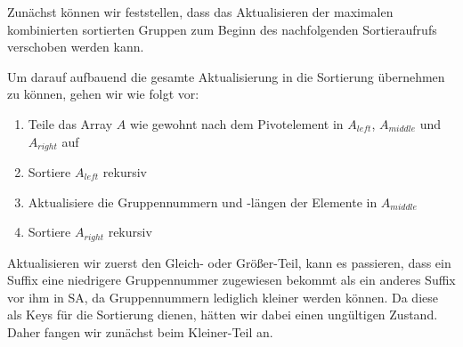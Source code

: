 Zunächst können wir feststellen, dass das Aktualisieren der maximalen kombinierten sortierten Gruppen zum Beginn des nachfolgenden Sortieraufrufs verschoben werden kann.  

Um darauf aufbauend die gesamte Aktualisierung in die Sortierung übernehmen zu können, gehen wir wie folgt vor:
\begin{enumerate}
\item Teile das Array $A$ wie gewohnt nach dem Pivotelement in $A_{left}$, $A_{middle}$ und $A_{right}$ auf
\item Sortiere $A_{left}$ rekursiv
\item Aktualisiere die Gruppennummern und -längen der Elemente in $A_{middle}$
\item Sortiere $A_{right}$ rekursiv
\end{enumerate}

Aktualisieren wir zuerst den \glqq Gleich\grqq{}- oder \glqq Größer\grqq{}-Teil, kann es passieren, dass 
ein Suffix eine niedrigere Gruppennummer zugewiesen bekommt als ein anderes Suffix vor ihm in SA, da 
Gruppennummern lediglich kleiner werden können. Da diese als Keys für die Sortierung dienen, hätten wir dabei einen ungültigen Zustand. Daher fangen wir zunächst beim \glqq Kleiner\grqq{}-Teil an. \\

